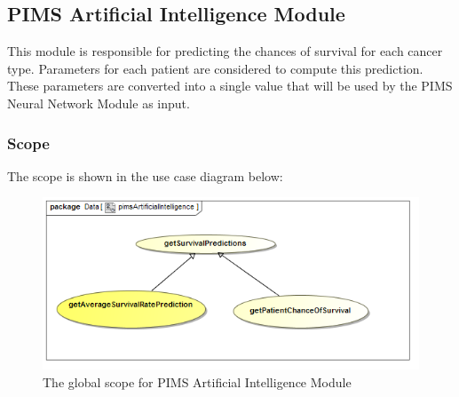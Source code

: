\subsection{PIMS Artificial Intelligence Module}
This module is responsible for predicting the chances of survival for each cancer type. Parameters for each patient are considered to compute this prediction. These parameters are converted into a single value that will be used by the PIMS Neural Network Module as input. \par 

\subsubsection{Scope}
The scope is shown in the use case diagram below: \par
\begin{figure}[H]
\centerline{\includegraphics[width=0.75\linewidth]{./Graphics/pimsAI/pimsArtificialIntelligence}}
\caption{The global scope for PIMS Artificial Intelligence Module}
\end{figure}

